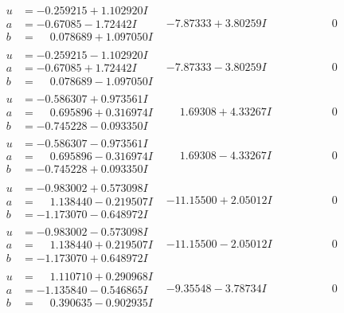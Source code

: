 \documentclass[1p]{elsarticle_modified}
\theoremstyle{definition}
\begin{document}
$$\begin{array}{c|c|c}
\begin{aligned}
u &= -0.259215 + 1.102920 I \\
a &= -0.67085 - 1.72442 I \\
b &= \phantom{-}0.078689 + 1.097050 I\end{aligned}
 & -7.87333 + 3.80259 I & \phantom{-0.000000 } 0 \\ \hline\begin{aligned}
u &= -0.259215 - 1.102920 I \\
a &= -0.67085 + 1.72442 I \\
b &= \phantom{-}0.078689 - 1.097050 I\end{aligned}
 & -7.87333 - 3.80259 I & \phantom{-0.000000 } 0 \\ \hline\begin{aligned}
u &= -0.586307 + 0.973561 I \\
a &= \phantom{-}0.695896 + 0.316974 I \\
b &= -0.745228 - 0.093350 I\end{aligned}
 & \phantom{-}1.69308 + 4.33267 I & \phantom{-0.000000 } 0 \\ \hline\begin{aligned}
u &= -0.586307 - 0.973561 I \\
a &= \phantom{-}0.695896 - 0.316974 I \\
b &= -0.745228 + 0.093350 I\end{aligned}
 & \phantom{-}1.69308 - 4.33267 I & \phantom{-0.000000 } 0 \\ \hline\begin{aligned}
u &= -0.983002 + 0.573098 I \\
a &= \phantom{-}1.138440 - 0.219507 I \\
b &= -1.173070 - 0.648972 I\end{aligned}
 & -11.15500 + 2.05012 I & \phantom{-0.000000 } 0 \\ \hline\begin{aligned}
u &= -0.983002 - 0.573098 I \\
a &= \phantom{-}1.138440 + 0.219507 I \\
b &= -1.173070 + 0.648972 I\end{aligned}
 & -11.15500 - 2.05012 I & \phantom{-0.000000 } 0 \\ \hline\begin{aligned}
u &= \phantom{-}1.110710 + 0.290968 I \\
a &= -1.135840 - 0.546865 I \\
b &= \phantom{-}0.390635 - 0.902935 I\end{aligned}
 & -9.35548 - 3.78734 I & \phantom{-0.000000 } 0 \\ \hline\begin{aligned}

\end{aligned}
\end{array}$$
\end{document}
